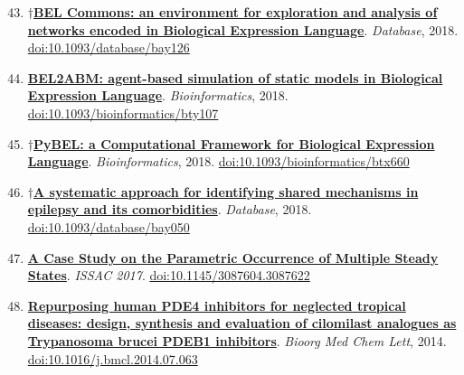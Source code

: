 \documentclass[10pt,a4paper,sans]{moderncv} %
\newcommand{\wikidata}[2]{\href{https://bioregistry.io/wikidata:#1?provider=scholia}{{#2}}}
\begin{document}
    \begin{enumerate}
    \setcounter{enumi}{42}
    \itemsep0.5em
        \item
        $\dagger$\wikidata{Q60302045}{\textbf{BEL Commons: an environment for exploration and analysis of networks encoded in Biological Expression Language}}.
    \textit{Database}, 2018.  {\scriptsize \href{https://bioregistry.io/doi:10.1093/DATABASE/BAY126}{doi:10.1093/database/bay126}}
        \item
        \wikidata{Q51056857}{\textbf{BEL2ABM: agent-based simulation of static models in Biological Expression Language}}.
    \textit{Bioinformatics}, 2018.  {\scriptsize \href{https://bioregistry.io/doi:10.1093/BIOINFORMATICS/BTY107}{doi:10.1093/bioinformatics/bty107}}
        \item
        $\dagger$\wikidata{Q42695788}{\textbf{PyBEL: a Computational Framework for Biological Expression Language}}.
    \textit{Bioinformatics}, 2018.  {\scriptsize \href{https://bioregistry.io/doi:10.1093/BIOINFORMATICS/BTX660}{doi:10.1093/bioinformatics/btx660}}
        \item
        $\dagger$\wikidata{Q55315340}{\textbf{A systematic approach for identifying shared mechanisms in epilepsy and its comorbidities}}.
    \textit{Database}, 2018.  {\scriptsize \href{https://bioregistry.io/doi:10.1093/DATABASE/BAY050}{doi:10.1093/database/bay050}}
    \end{enumerate}
    \begin{enumerate}
    \setcounter{enumi}{46}
    \itemsep0.5em
        \item
        \wikidata{Q47479157}{\textbf{A Case Study on the Parametric Occurrence of Multiple Steady States}}.
    \textit{ISSAC 2017}.  {\scriptsize \href{https://bioregistry.io/doi:10.1145/3087604.3087622}{doi:10.1145/3087604.3087622}}
    \end{enumerate}
    \begin{enumerate}
    \setcounter{enumi}{47}
    \itemsep0.5em
        \item
        \wikidata{Q34138086}{\textbf{Repurposing human PDE4 inhibitors for neglected tropical diseases: design, synthesis and evaluation of cilomilast analogues as Trypanosoma brucei PDEB1 inhibitors}}.
    \textit{Bioorg Med Chem Lett}, 2014.  {\scriptsize \href{https://bioregistry.io/doi:10.1016/J.BMCL.2014.07.063}{doi:10.1016/j.bmcl.2014.07.063}}
    \end{enumerate}
\end{document}
